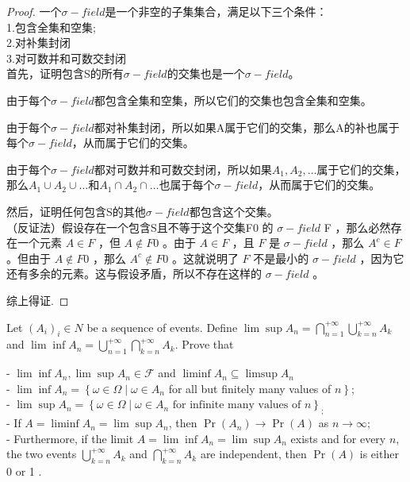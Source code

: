 \documentclass[12pt, a4paper, oneside]{ctexart}
\begin{document}
\begin{proof}
  一个$\sigma-field$是一个非空的子集集合，满足以下三个条件：\\
  1.包含全集和空集;\\
  2.对补集封闭\\
  3.对可数并和可数交封闭\\

  首先，证明包含S的所有$\sigma-field$的交集也是一个$\sigma-field$。

  由于每个$\sigma-field$都包含全集和空集，所以它们的交集也包含全集和空集。

  由于每个$\sigma-field$都对补集封闭，所以如果A属于它们的交集，那么A的补也属于每个$\sigma-field$，从而属于它们的交集。

  由于每个$\sigma-field$都对可数并和可数交封闭，所以如果$A_1, A_2, …$属于它们的交集，那么$A_1\cup A_2\cup …$和$A_1\cap A_2\cap …$也属于每个$\sigma-field$，从而属于它们的交集。

  然后，证明任何包含S的其他$\sigma-field$都包含这个交集。\\
  （反证法）假设存在一个包含S且不等于这个交集F0 的 $\sigma-field$ F ，那么必然存在一个元素 $A \in F$ ，但 $A \notin F0$ 。由于 $A \in F$ ，且 $F$ 是 $\sigma-field$ ，那么 $A^c \in F$ 。但由于 $A \notin F0$ ，那么 $A^c \notin F0$ 。这就说明了 $F$ 不是最小的 $\sigma-field$ ，因为它还有多余的元素。这与假设矛盾，所以不存在这样的 $\sigma-field$ 。

  综上得证.
\end{proof}
\begin{problem}
 Let $( A_i)_i \in N$ be a sequence of events. Define $\lim \sup A_n = \bigcap_{n = 1}^{+ \infty} \bigcup_{k = n}^{+ \infty} A_k$ and $\lim \inf A_n = \bigcup_{n = 1}^{+ \infty} \bigcap_{k = n}^ {+ \infty} A_k$. Prove that

- $\lim \inf A_n, \lim \sup A_n \in \mathcal{F}$ and $\liminf A_n \subseteq \limsup A_n$\\
- $\lim \inf A_n=\left\{\omega \in \Omega \mid \omega \in A_n\right.$ for all but finitely many values of $\left.n\right\}$;\\
- $\lim \sup A_n=\left\{\omega \in \Omega \mid \omega \in A_n \text { for infinite many values of } n\right\}_{\text {; }}$\\
- If $A=\liminf A_n=\lim \sup A_n$, then $\operatorname{Pr}\left(A_n\right) \rightarrow \operatorname{Pr}(A)$ as $n \rightarrow \infty$;\\
- Furthermore, if the limit $A=\lim \inf A_n=\lim \sup A_n$ exists and for every $n$, the two events $\bigcup_{k=n}^{+\infty} A_k$ and $\bigcap_{k=n}^{+\infty} A_k$ are independent, then $\operatorname{Pr}(A)$ is either 0 or 1 .

\end{problem}
\end{document}
